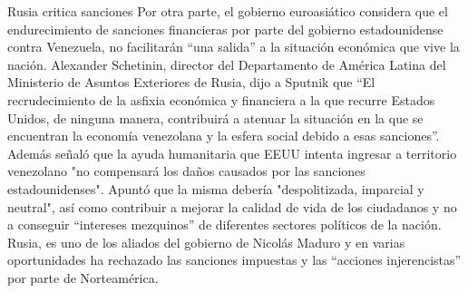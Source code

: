 \documentclass{article}%
\begin{document}
\newline%
%
Rusia critica sanciones%
\newline%
%
Por otra parte, el gobierno euroasiático considera que el endurecimiento de sanciones financieras por parte del gobierno estadounidense contra Venezuela, no facilitarán “una salida” a la situación económica que vive la nación.%
\newline%
%
Alexander Schetinin, director del Departamento de América Latina del Ministerio de Asuntos Exteriores de Rusia, dijo a Sputnik que “El recrudecimiento de la asfixia económica y financiera a la que recurre Estados Unidos, de ninguna manera, contribuirá a atenuar la situación en la que se encuentran la economía venezolana y la esfera social debido a esas sanciones”.%
\newline%
%
Además señaló que la ayuda humanitaria que EEUU intenta ingresar a territorio venezolano "no compensará los daños causados por las sanciones estadounidenses". Apuntó que la misma debería "despolitizada, imparcial y neutral", así como contribuir a mejorar la calidad de vida de los ciudadanos y no a conseguir “intereses mezquinos” de diferentes sectores políticos de la nación.%
\newline%
%
Rusia, es uno de los aliados del gobierno de Nicolás Maduro y en varias oportunidades ha rechazado las sanciones impuestas y las “acciones injerencistas” por parte de Norteamérica.%
\newline%
%
\end{document}
